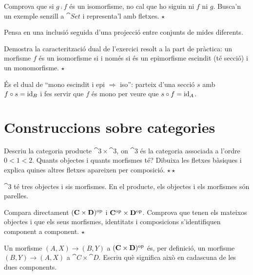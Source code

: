 \begin{exercici}
Comprova que si $g\comp f$ és un isomorfisme, no cal que ho siguin ni $f$ ni $g$. Busca'n un exemple senzill a $\cat{Set}$ i representa'l amb fletxes. \hfill{\normalfont$\star$}
\begin{indicacio}
Pensa en una inclusió seguida d'una projecció entre conjunts de mides diferents.
\end{indicacio}
\end{exercici}

\begin{exercici}
Demostra la caracterització dual de l'exercici resolt a la part de pràctica: un morfisme $f$ és un isomorfisme si i només si és un epimorfisme escindit (té secció) i un monomorfisme. \hfill{\normalfont$\star$}
\begin{indicacio}
És el dual de \enquote{mono escindit i epi $\Rightarrow$ iso}: parteix d'una secció $s$ amb $f\circ s=\operatorname{id}_B$ i fes servir que $f$ és mono per veure que $s\circ f=\operatorname{id}_A$.
\end{indicacio}
\end{exercici}

\section{Construccions sobre categories}

\begin{exercici}
Descriu la categoria producte $\cat{3}\times\cat{3}$, on $\cat{3}$ és la categoria associada a l'ordre $0<1<2$. Quants objectes i quants morfismes té? Dibuixa les fletxes bàsiques i explica quines altres fletxes apareixen per composició. \hfill{\normalfont$\star\star$}
\begin{indicacio}
$\cat{3}$ té tres objectes i sis morfismes. En el producte, els objectes i els morfismes són parelles.
\end{indicacio}
\end{exercici}

\begin{exercici}
Compara directament $(\mathbf{C}\times\mathbf{D})^{\mathrm{op}}$ i $\mathbf{C}^{\mathrm{op}}\times\mathbf{D}^{\mathrm{op}}$. Comprova que tenen els mateixos objectes i que els seus morfismes, identitats i composicions s'identifiquen component a component. \hfill{\normalfont$\star$}
\begin{indicacio}
Un morfisme $(A,X)\to(B,Y)$ a $(\mathbf{C}\times\mathbf{D})^{\mathrm{op}}$ és, per definició, un morfisme $(B,Y)\to(A,X)$ a $\cat{C}\times\cat{D}$. Escriu què significa això en cadascuna de les dues components.
\end{indicacio}
\end{exercici}

